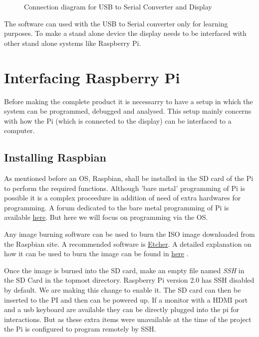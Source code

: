 \documentclass[12pt, a4paper, twoside]{article}
\begin{document}
\begin{figure}
	\centering
	\scalebox{0.7}{}
	\caption{Connection diagram for USB to Serial Converter and Display}
	\label{fig_convLcdCon}
\end{figure}

The software can used with the USB to Serial converter only for learning purposes. To make a stand alone device the display needs to be interfaced with other stand alone systems like Raspberry Pi.

\section{Interfacing Raspberry Pi}
	Before making the complete product it is necessarry to have a setup in which the system can be programmed, debugged and analysed. This setup mainly concerns with how the Pi (which is connected to the display) can be interfaced to a computer. 

\subsection{Installing Raspbian}
	As mentioned before an OS, Raspbian, shall be installed in the SD card of the Pi to perform the required functions. Although 'bare metal' programming of Pi is possible it is a complex proceedure in addition of need of extra hardwares for programming. A forum dedicated to the bare metal programming of Pi is available \href{https://www.raspberrypi.org/forums/viewforum.php?f=72}{here}. But here we will focus on programming via the OS.

	Any image burning software can be used to burn the ISO image downloaded from the Raspbian site. A recommended software is \href{https://etcher.io/}{Etcher}. A detailed explanation on how it can be used to burn the image can be found in \href{https://www.raspberrypi.org/magpi/pi-sd-etcher/}{here} \cite{bib_etcher}.

	Once the image is burned into the SD card, make an empty file named \textit{SSH} in the SD Card in the topmost directory. Raspberry Pi version 2.0 has SSH disabled by default. We are making this change to enable it. The SD card can then be inserted to the PI and then can be powered up. If a monitor with a HDMI port and a usb keyboard are available they can be directly plugged into the pi for interactions. But as these extra items were unavailable at the time of the project the Pi is configured to program remotely by SSH.
\end{document}
